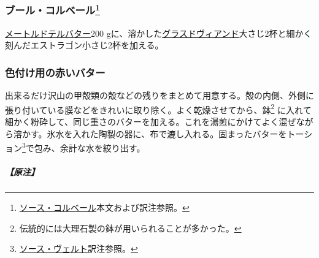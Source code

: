\begin{recette}
\hypertarget{beurre-colbert}{%
\subsubsection[ブール・コルベール]{\texorpdfstring{ブール・コルベール\footnote{\protect\hyperlink{sauce-colbert}{ソース・コルベール}本文および訳注参照。}}{ブール・コルベール}}\label{beurre-colbert}}



\protect\hyperlink{beurre-maitre-d-hotel}{メートルドテルバター}200
gに、溶かした\protect\hyperlink{glace-de-viande}{グラスドヴィアンド}大さじ2杯と細かく刻んだエストラゴン小さじ2杯を加える。

\hypertarget{beurre-colorant-rouge}{%
\subsubsection{色付け用の赤いバター}\label{beurre-colorant-rouge}}



出来るだけ沢山の甲殻類の殻などの残りをまとめて用意する。殻の内側、外側に張り付いている膜などをきれいに取り除く。よく乾燥させてから、鉢\footnote{伝統的には大理石製の鉢が用いられることが多かった。}
に入れて細かく粉砕して、同じ重さのバターを加える。これを湯煎にかけてよく混ぜながら溶かす。氷水を入れた陶製の器に、布で漉し入れる。固まったバターをトーション\footnote{\protect\hyperlink{sauce-verte}{ソース・ヴェルト}訳注参照。}で包み、余計な水を絞り出す。

\hypertarget{nota-beurre-colorant-rouge}{%
\subparagraph{【原注】}\label{nota-beurre-colorant-rouge}}


\end{recette}
